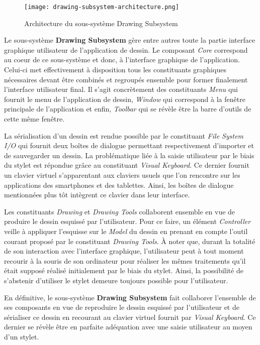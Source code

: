 \documentclass[11pt,a4paper,oldfontcommands]{memoir}
\begin{document}
\begin{figure}[H]
\centering
\texttt{[image: drawing-subsystem-architecture.png]}
\caption{Architecture du sous-système Drawing Subsystem}
\end{figure}

Le sous-système \textbf{Drawing Subsystem} gère entre autres toute la partie interface graphique utilisateur de l'application de dessin. Le composant \textit{Core} correspond au coeur de ce sous-système et donc, à l'interface graphique de l'application. Celui-ci met effectivement à disposition tous les constituants graphiques nécessaires devant être combinés et regroupés ensemble pour former finalement l'interface utilisateur final. Il s'agit concrètement des constituants \textit{Menu} qui fournit le menu de l'application de dessin, \textit{Window} qui correspond à la fenêtre principale de l'application et enfin, \textit{Toolbar} qui se révèle être la barre d'outils de cette même fenêtre.

La sérialisation d'un dessin est rendue possible par le constituant \textit{File System I/O} qui fournit deux boîtes de dialogue permettant respectivement d'importer et de sauvegarder un dessin. La problématique liée à la saisie utilisateur par le biais du stylet est répondue grâce au constituant \textit{Visual Keyboard}. Ce dernier fournit un clavier virtuel s'apparentant aux claviers usuels que l'on rencontre sur les applications des smartphones et des tablettes. Ainsi, les boîtes de dialogue mentionnées plus tôt intègrent ce clavier dans leur interface.

Les constituants \textit{Drawing} et \textit{Drawing Tools} collaborent ensemble en vue de produire le dessin esquissé par l'utilisateur. Pour ce faire, un élément \textit{Controller} veille à appliquer l'esquisse sur le \textit{Model} du dessin en prenant en compte l'outil courant proposé par le constituant \textit{Drawing Tools}. À noter que, durant la totalité de son interaction avec l'interface graphique, l'utilisateur peut à tout moment recourir à la souris de son ordinateur pour réaliser les mêmes traitements qu'il était supposé réalisé initialement par le biais du stylet. Ainsi, la possibilité de s'abstenir d'utiliser le stylet demeure toujours possible pour l'utilisateur.

En définitive, le sous-système \textbf{Drawing Subsystem} fait collaborer l'ensemble de ses composants en vue de reproduire le dessin esquissé par l'utilisateur et de sérialiser ce dessin en recourant au clavier virtuel fournit par \textit{Visual Keyboard}. Ce dernier se révèle être en parfaite adéquation avec une saisie utilisateur au moyen d'un stylet.
\end{document}

